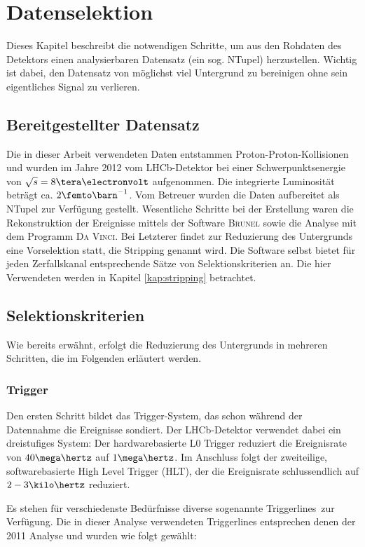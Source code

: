 \chapter{Datenselektion} \label{kap:datenselektion}
Dieses Kapitel beschreibt die notwendigen Schritte, um aus den Rohdaten des Detektors einen analysierbaren Datensatz (ein sog. NTupel) herzustellen. Wichtig ist dabei, den Datensatz von möglichst viel Untergrund zu bereinigen ohne sein eigentliches Signal zu verlieren.

\section{Bereitgestellter Datensatz}
Die in dieser Arbeit verwendeten Daten entstammen Proton-Proton-Kollisionen und wurden im Jahre 2012 vom LHCb-Detektor bei einer Schwerpunktsenergie von $\sqrt{s} = 8\tera\electronvolt$ aufgenommen. Die integrierte Luminosität beträgt ca. $2\femto\barn^{-1}$. Vom Betreuer wurden die Daten aufbereitet als NTupel zur Verfügung gestellt. Wesentliche Schritte bei der Erstellung waren die Rekonstruktion der Ereignisse mittels der Software \textsc{Brunel} sowie die Analyse mit dem Programm \textsc{Da Vinci}. Bei Letzterer findet zur Reduzierung des Untergrunds eine Vorselektion statt, die Stripping genannt wird. Die Software selbst bietet für jeden Zerfallskanal entsprechende Sätze von Selektionskriterien an. Die hier Verwendeten werden in Kapitel \ref{kap:stripping} betrachtet.


\section{Selektionskriterien}
Wie bereits erwähnt, erfolgt die Reduzierung des Untergrunds in mehreren Schritten, die im Folgenden erläutert werden.

\subsection{Trigger} \label{kap:trigger}
Den ersten Schritt bildet das Trigger-System, das schon während der Datennahme die Ereignisse sondiert. Der LHCb-Detektor verwendet dabei ein dreistufiges System: Der hardwarebasierte \glqq L0 Trigger \grqq reduziert die Ereignisrate von $40\mega\hertz$ auf $1\mega\hertz$. Im Anschluss folgt der zweiteilige, softwarebasierte \glqq High Level Trigger \grqq (HLT), der die Ereignisrate schlussendlich auf $2-3\kilo\hertz$ reduziert. \cite{trigger} 

Es stehen für verschiedenste Bedürfnisse diverse sogenannte \glqq Triggerlines\grqq\ zur Verfügung. Die in dieser Analyse verwendeten Triggerlines entsprechen denen der 2011 Analyse \cite{lhcb-paper} und wurden wie folgt gewählt:


